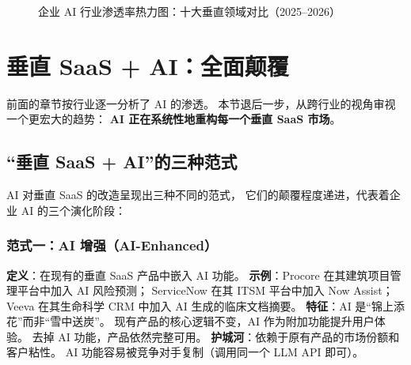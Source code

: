 \begin{figure}[htbp]
\caption{企业 AI 行业渗透率热力图：十大垂直领域对比（2025--2026）}
\label{fig:ent-heatmap}
\end{figure}

\section{垂直 SaaS + AI：全面颠覆}
\label{sec:ent-vertical-saas}

前面的章节按行业逐一分析了 AI 的渗透。
本节退后一步，从跨行业的视角审视一个更宏大的趋势：
\textbf{AI 正在系统性地重构每一个垂直 SaaS 市场}。

\subsection{``垂直 SaaS + AI''的三种范式}

AI 对垂直 SaaS 的改造呈现出三种不同的范式，
它们的颠覆程度递进，代表着企业 AI 的三个演化阶段：

\subsubsection{范式一：AI 增强（AI-Enhanced）}
\textbf{定义}：在现有的垂直 SaaS 产品中嵌入 AI 功能。
\textbf{示例}：Procore 在其建筑项目管理平台中加入 AI 风险预测；
ServiceNow 在其 ITSM 平台中加入 Now Assist；
Veeva 在其生命科学 CRM 中加入 AI 生成的临床文档摘要。
\textbf{特征}：AI 是``锦上添花''而非``雪中送炭''。
现有产品的核心逻辑不变，AI 作为附加功能提升用户体验。
去掉 AI 功能，产品依然完整可用。
\textbf{护城河}：依赖于原有产品的市场份额和客户粘性。
AI 功能容易被竞争对手复制（调用同一个 LLM API 即可）。

